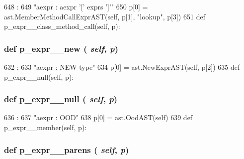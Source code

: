 \begin{DoxyCode}
648                                                   :
649         "aexpr : aexpr '[' exprs ']'"
650         p[0] = ast.MemberMethodCallExprAST(self, p[1], "lookup", p[3])
651 
    def p_expr__class_method_call(self, p):
\end{DoxyCode}
\hypertarget{classslicc_1_1parser_1_1SLICC_a1b0308a72b6175e110a9ab3211b3f5f7}{
\subsubsection[{p\_\-expr\_\-\_\-new}]{\setlength{\rightskip}{0pt plus 5cm}def p\_\-expr\_\-\_\-new ( {\em self}, \/   {\em p})}}
\label{classslicc_1_1parser_1_1SLICC_a1b0308a72b6175e110a9ab3211b3f5f7}



\begin{DoxyCode}
632                             :
633         "aexpr : NEW type"
634         p[0] = ast.NewExprAST(self, p[2])
635 
    def p_expr__null(self, p):
\end{DoxyCode}
\hypertarget{classslicc_1_1parser_1_1SLICC_a530b5d501e3749694fc8ff43b0cccfe6}{
\subsubsection[{p\_\-expr\_\-\_\-null}]{\setlength{\rightskip}{0pt plus 5cm}def p\_\-expr\_\-\_\-null ( {\em self}, \/   {\em p})}}
\label{classslicc_1_1parser_1_1SLICC_a530b5d501e3749694fc8ff43b0cccfe6}



\begin{DoxyCode}
636                              :
637         "aexpr : OOD"
638         p[0] = ast.OodAST(self)
639 
    def p_expr__member(self, p):
\end{DoxyCode}
\hypertarget{classslicc_1_1parser_1_1SLICC_a7d93fa884e4ca511dd54f7b402ffaf6f}{
\subsubsection[{p\_\-expr\_\-\_\-parens}]{\setlength{\rightskip}{0pt plus 5cm}def p\_\-expr\_\-\_\-parens ( {\em self}, \/   {\em p})}}
\label{classslicc_1_1parser_1_1SLICC_a7d93fa884e4ca511dd54f7b402ffaf6f}



